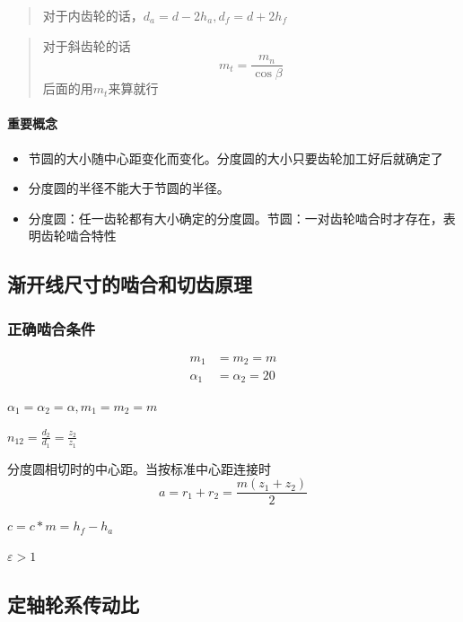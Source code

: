 \documentclass[twocolumn]{ctexart}
\begin{document}
\begin{quote}
{\qquad{}\ccwd\kaishu{}
对于内齿轮的话，$d_a=d-2h_a,d_f=d+2h_f$
}
\end{quote}

\begin{quote}
  {\qquad{}\ccwd\kaishu{}
  对于斜齿轮的话
  $$
  m_t=\frac{m_n}{\cos \beta}
  $$
  后面的用$m_t$来算就行
  }
  
\end{quote}
\paragraph{重要概念}
\begin{itemize}
\item 节圆的大小随中心距变化而变化。分度圆的大小只要齿轮加工好后就确定了
\item 分度圆的半径不能大于节圆的半径。
\item 分度圆：任一齿轮都有大小确定的分度圆。节圆：一对齿轮啮合时才存在，表明齿轮啮合特性
\end{itemize}

\subsection{渐开线尺寸的啮合和切齿原理}
\subsubsection{正确啮合条件}
\begin{align*}
  m_1&=m_2=m\\
\alpha_1&=\alpha_2=20
\end{align*}
\begin{description}[leftmargin=1.3cm,style=nextline,nosep]%
  \item[正确啮合条件] $\alpha_{1}=\alpha_2=\alpha,m_1=m_2=m$ 
  \item[传动比] $n_{12}=\frac{d_2}{d_1}=\frac{z_2}{z_1}$ 
  \item[标准中心距] 分度圆相切时的中心距。当按标准中心距连接时
   $$
   a=r_1+r_2=\frac{m(z_1+z_2)}{2}
   $$
   \item[顶隙] $c=c*m=h_f-h_a$ 
   \item[连续传动] $\varepsilon >1$ 
\end{description}

\subsection{定轴轮系传动比}
\end{document}

